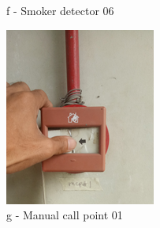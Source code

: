 \begin{figure}[h]
\begin{minipage}[b]{0.22\linewidth}
		\caption*{f - Smoker detector 06}
	\end{minipage}
	\hspace{0.03cm}
	\begin{minipage}[b]{0.22\linewidth}
		\centering
		\includegraphics[width=\textwidth]{figures/ch05_fdas_mcp01}
		\caption*{g - Manual call point 01}
	\end{minipage}
	\hspace{0.03cm}
\begin{minipage}[b]{0.22\linewidth}
	\centering

\end{minipage}
\end{figure}
